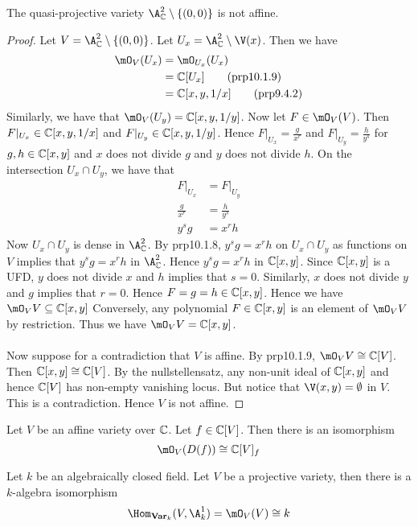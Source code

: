 \documentclass[a4paper]{article}
\begin{document}
\begin{eg}{}{} The quasi-projective variety $\A_\C^2\setminus\{(0,0)\}$ is not affine. 
\begin{proof}
Let $V=\A_\C^2\setminus\{(0,0)\}$. Let $U_x=\A_\C^2\setminus\V(x)$. Then we have 
\begin{align*}
\mO_V(U_x)&=\mO_{U_x}(U_x)\\
&=\C[U_x]\tag{prp10.1.9}\\
&=\C[x,y,1/x]\tag{prp9.4.2}
\end{align*}
Similarly, we have that $\mO_V(U_y)=\C[x,y,1/y]$. Now let $F\in\mO_V(V)$. Then $F|_{U_x}\in\mathbb{C}[x,y,1/x]$ and $F|_{U_y}\in\mathbb{C}[x,y,1/y]$. Hence $F|_{U_x}=\frac{g}{x^r}$ and $F|_{U_y}=\frac{h}{y^s}$ for $g,h\in\mathbb{C}[x,y]$ and $x$ does not divide $g$ and $y$ does not divide $h$. On the intersection $U_x\cap U_y$, we have that 
\begin{align*}
F|_{U_x}&=F|_{U_y}\\
\frac{g}{x^r}&=\frac{h}{y^s}\\
y^sg&=x^rh
\end{align*}
Now $U_x\cap U_y$ is dense in $\A_\C^2$. By prp10.1.8, $y^sg=x^rh$ on $U_x\cap U_y$ as functions on $V$ implies that $y^sg=x^rh$ in $\A_\C^2$. Hence $y^sg=x^rh$ in $\mathbb{C}[x,y]$. Since $\mathbb{C}[x,y]$ is a UFD, $y$ does not divide $x$ and $h$ implies that $s=0$. Similarly, $x$ does not divide $y$ and $g$ implies that $r=0$. Hence $F=g=h\in\mathbb{C}[x,y]$. Hence we have $\mO_VV\subseteq\C[x,y]$ Conversely, any polynomial $F\in\mathbb{C}[x,y]$ is an element of $\mO_VV$ by restriction. Thus we have $\mO_VV=\C[x,y]$. \\~\\

Now suppose for a contradiction that $V$ is affine. By prp10.1.9, $\mO_VV\cong\C[V]$. Then $\mathbb{C}[x,y]\cong\mathbb{C}[V]$. By the nullstellensatz, any non-unit ideal of $\mathbb{C}[x,y]$ and hence $\mathbb{C}[V]$ has non-empty vanishing locus. But notice that $\V(x,y)=\emptyset$ in $V$. This is a contradiction. Hence $V$ is not affine. 
\end{proof}
\end{eg}

\begin{prp}{}{} Let $V$ be an affine variety over $\mathbb{C}$. Let $f\in\mathbb{C}[V]$. Then there is an isomorphism $$\mO_V(D(f))\cong\C[V]_f$$
\end{prp}

\begin{prp}{}{} Let $k$ be an algebraically closed field. Let $V$ be a projective variety, then there is a $k$-algebra isomorphism $$\Hom_{\bold{Var}_k}(V,\A_k^1)=\mO_V(V)\cong k$$
\end{prp}
\end{document}
